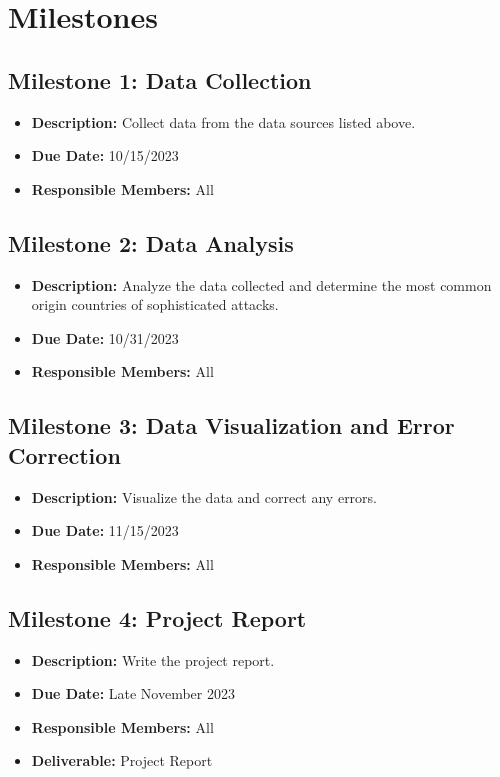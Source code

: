 \documentclass[letterpaper, 10 pt, conference]{ieeeconf}  %
\begin{document}
\section{Milestones}

    \subsection*{Milestone 1: Data Collection}
    \begin{itemize}
        \item \textbf{Description:} Collect data from the data sources listed above.
        \item \textbf{Due Date:} 10/15/2023
        \item \textbf{Responsible Members:} All
    \end{itemize}
    \subsection*{Milestone 2: Data Analysis}
    \begin{itemize}
        \item \textbf{Description:} Analyze the data collected and determine the most common origin countries of sophisticated attacks.
        \item \textbf{Due Date:} 10/31/2023
        \item \textbf{Responsible Members:} All
    \end{itemize}
    \subsection*{Milestone 3: Data Visualization and Error Correction}
    \begin{itemize}
        \item \textbf{Description:} Visualize the data and correct any errors.
        \item \textbf{Due Date:} 11/15/2023
        \item \textbf{Responsible Members:} All
    \end{itemize}
    \subsection*{Milestone 4: Project Report}
    \begin{itemize}
        \item \textbf{Description:} Write the project report.
        \item \textbf{Due Date:} Late November 2023
        \item \textbf{Responsible Members:} All
        \item \textbf{Deliverable:} Project Report
    \end{itemize}
\end{document}
